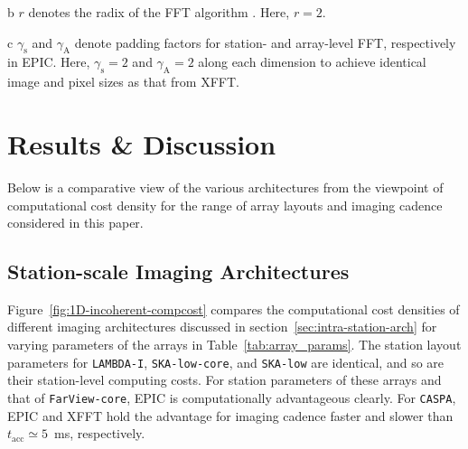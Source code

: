 \documentclass[
  journal=pasa,
  manuscript=article-type,
  year=2020,
  volume=37,
]{cup-journal}
\begin{document}
\begin{table}[htb!]
\begin{threeparttable}
\begin{tablenotes}[hang]
\item[b]$r$ denotes the radix of the FFT algorithm \citep{Cooley+Tukey1965}. Here, $r=2$. 
\item[c]$\gamma_\textrm{s}$ and $\gamma_\textrm{A}$ denote padding factors for station- and array-level FFT, respectively in EPIC. Here, $\gamma_\textrm{s}=2$ and $\gamma_\textrm{A}=2$ along each dimension to achieve identical image and pixel sizes as that from XFFT.
\end{tablenotes}
\end{threeparttable}
\end{table}

\section{Results \& Discussion} \label{sec:results}

Below is a comparative view of the various architectures from the viewpoint of computational cost density for the range of array layouts and imaging cadence considered in this paper. 

\subsection{Station-scale Imaging Architectures}\label{sec:station-scale-imaging}

Figure~\ref{fig:1D-incoherent-compcost} compares the computational cost densities of different imaging architectures discussed in section~\ref{sec:intra-station-arch} for varying parameters of the arrays in Table~\ref{tab:array_params}. The station layout parameters for \texttt{LAMBDA-I}, \texttt{SKA-low-core}, and \texttt{SKA-low} are identical, and so are their station-level computing costs. For station parameters of these arrays and that of \texttt{FarView-core}, EPIC is computationally advantageous clearly. For \texttt{CASPA}, EPIC and XFFT hold the advantage for imaging cadence faster and slower than $t_\textrm{acc}\simeq 5$~ms, respectively.
\end{document}
